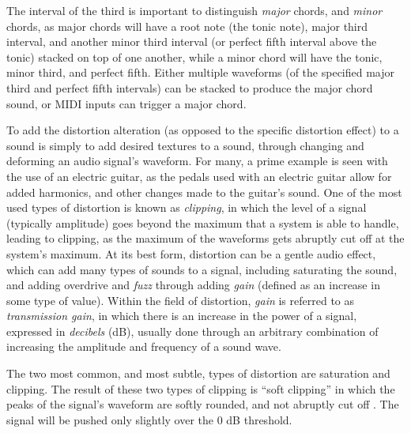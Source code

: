 The interval of the third is important to distinguish \textit{major} chords, and \textit{minor} chords, as major chords will have a root note (the tonic note), major third interval, and another minor third interval (or perfect fifth interval above the tonic) stacked on top of one another, while a minor chord will have the tonic, minor third, and perfect fifth. Either multiple waveforms (of the specified major third and perfect fifth intervals) can be stacked to produce the major chord sound, or MIDI inputs can trigger a major chord.

To add the distortion alteration (as opposed to the specific distortion effect) to a sound is simply to add desired textures to a sound, through changing and deforming an audio signal's waveform. For many, a prime example is seen with the use of an electric guitar, as the pedals used with an electric guitar allow for added harmonics, and other changes made to the guitar's sound. One of the most used types of distortion is known as \textit{clipping}, in which the level of a signal (typically amplitude) goes beyond the maximum that a system is able to handle, leading to clipping, as the maximum of the waveforms gets abruptly cut off at the system's maximum. At its best form, distortion can be a gentle audio effect, which can add many types of sounds to a signal, including saturating the sound, and adding overdrive and \textit{fuzz} through adding \textit{gain} (defined as an increase in some type of value). Within the field of distortion, \textit{gain} is referred to as \textit{transmission gain}, in which there is an increase in the power of a signal, expressed in \textit{decibels} (dB), usually done through an arbitrary combination of increasing the amplitude and frequency of a sound wave.

The two most common, and most subtle, types of distortion are saturation and clipping. The result of these two types of clipping is ``soft clipping'' in which the peaks of the signal's waveform are softly rounded, and not abruptly cut off \cite{Tarr_2019}. The signal will be pushed only slightly over the 0 dB threshold. 

